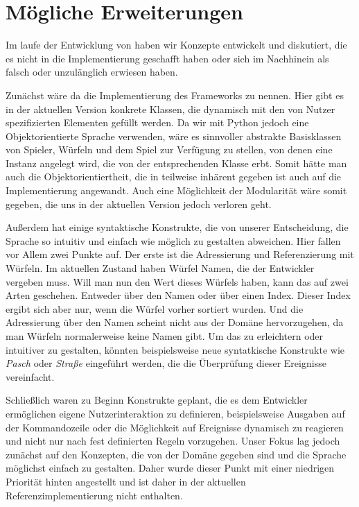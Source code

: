 \section{Mögliche Erweiterungen} %
\label{sec:mogliche_erweiterungen}
	Im laufe der Entwicklung von \dg haben wir Konzepte entwickelt und diskutiert, die es nicht in die Implementierung geschafft haben oder sich im Nachhinein als falsch oder unzulänglich erwiesen haben.
	
	Zunächst wäre da die Implementierung des Frameworks zu nennen. Hier gibt es in der aktuellen Version konkrete Klassen, die dynamisch mit den von Nutzer spezifizierten Elementen gefüllt werden. Da wir mit Python jedoch eine Objektorientierte Sprache verwenden, wäre es sinnvoller abstrakte Basisklassen von Spieler, Würfeln und dem Spiel zur Verfügung zu stellen, von denen eine Instanz angelegt wird, die von der entsprechenden Klasse erbt. Somit hätte man auch die Objektorientiertheit, die in \dg teilweise inhärent gegeben ist auch auf die Implementierung angewandt. Auch eine Möglichkeit der Modularität wäre somit gegeben, die uns in der aktuellen Version jedoch verloren geht.
	
	Außerdem hat \dg einige syntaktische Konstrukte, die von unserer Entscheidung, die Sprache so intuitiv und einfach wie möglich zu gestalten abweichen. Hier fallen vor Allem zwei Punkte auf. Der erste ist die Adressierung und Referenzierung mit Würfeln. Im aktuellen Zustand haben Würfel Namen, die der Entwickler vergeben muss. Will man nun den Wert dieses Würfels haben, kann das auf zwei Arten geschehen. Entweder über den Namen oder über einen Index. Dieser Index ergibt sich aber nur, wenn die Würfel vorher sortiert wurden. Und die Adressierung über den Namen scheint nicht aus der Domäne hervorzugehen, da man Würfeln normalerweise keine Namen gibt. Um das zu erleichtern oder intuitiver zu gestalten, könnten beispielsweise neue syntatkische Konstrukte wie \emph{Pasch} oder \emph{Straße} eingeführt werden, die die Überprüfung dieser Ereignisse vereinfacht.
	
	Schließlich waren zu Beginn Konstrukte geplant, die es dem Entwickler ermöglichen eigene Nutzerinteraktion zu definieren, beispielsweise Ausgaben auf der Kommandozeile oder die Möglichkeit auf Ereignisse dynamisch zu reagieren und nicht nur nach fest definierten Regeln vorzugehen. Unser Fokus lag jedoch zunächst auf den Konzepten, die von der Domäne gegeben sind und die Sprache möglichst einfach zu gestalten. Daher wurde dieser Punkt mit einer niedrigen Priorität hinten angestellt und ist daher in der aktuellen Referenzimplementierung nicht enthalten.














